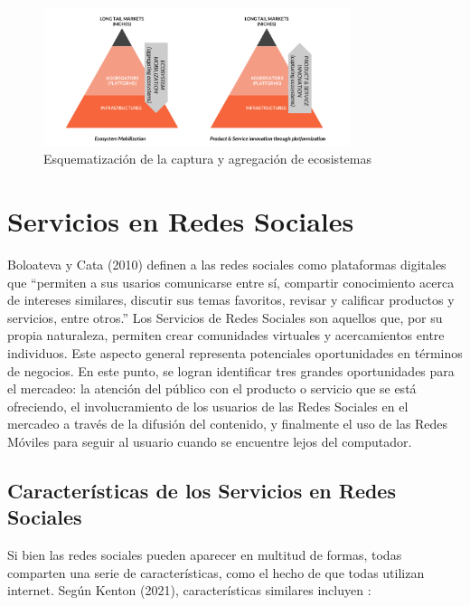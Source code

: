 \begin{figure}[H]
\centering
\includegraphics[width=0.80\textwidth]{img/4.png}
\caption{Esquematización de la captura y agregación de ecosistemas \cite{boundarylessplatform}}
\label{figure:platformSchema}
\end{figure}

\section{Servicios en Redes Sociales}

Boloateva y Cata (2010) definen a las redes sociales como plataformas digitales que “permiten a sus usarios comunicarse entre sí, compartir conocimiento acerca de intereses similares, discutir sus temas favoritos, revisar y calificar productos y servicios, entre otros.”
Los Servicios de Redes Sociales son aquellos que, por su propia naturaleza, permiten crear comunidades virtuales y acercamientos entre individuos. Este aspecto general representa potenciales oportunidades en términos de negocios. En este punto, se logran identificar tres grandes oportunidades para el mercadeo: la atención del público con el producto o servicio que se está ofreciendo, el involucramiento de los usuarios de las Redes Sociales en el mercadeo a través de la difusión del contenido, y finalmente el uso de las Redes Móviles para seguir al usuario cuando se encuentre lejos del computador.\cite{bolotaevaCata2011}

\subsection{Características de los Servicios en Redes Sociales}

Si bien las redes sociales pueden aparecer en multitud de formas, todas comparten una serie de características, como el hecho de que todas utilizan internet. Según Kenton (2021), características similares incluyen \cite{kenton2021}:

